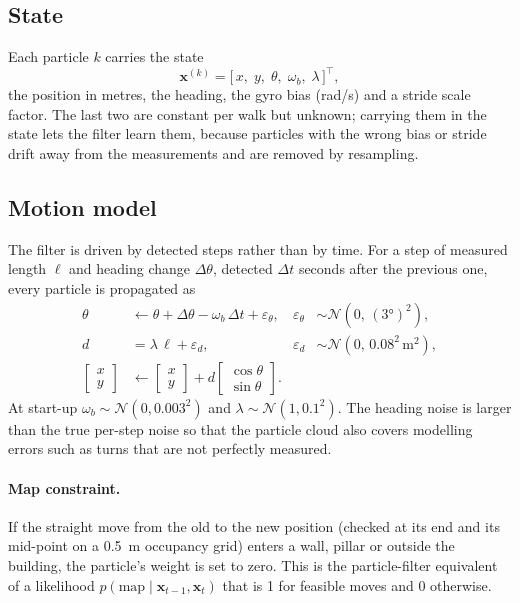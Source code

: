 \documentclass[11pt,a4paper]{article}
\begin{document}
\subsection{State}
Each particle $k$ carries the state
\begin{equation}
  \mathbf{x}^{(k)} = \bigl[\,x,\; y,\; \theta,\; \omega_b,\; \lambda\,\bigr]^{\top},
\end{equation}
the position in metres, the heading, the gyro bias (rad/s) and a stride scale factor.
The last two are constant per walk but unknown; carrying them in the state lets the
filter learn them, because particles with the wrong bias or stride drift away from the
measurements and are removed by resampling.

\subsection{Motion model}
The filter is driven by detected steps rather than by time. For a step of measured
length $\ell$ and heading change $\Delta\theta$, detected $\Delta t$ seconds after the
previous one, every particle is propagated as
\begin{align}
  \theta  &\leftarrow \theta + \Delta\theta - \omega_b\,\Delta t + \varepsilon_\theta,
           & \varepsilon_\theta &\sim \mathcal{N}(0,\, (\ang{3})^2), \label{eq:motion-heading}\\
  d       &= \lambda\,\ell + \varepsilon_d, & \varepsilon_d &\sim \mathcal{N}(0,\, 0.08^2\,\text{m}^2),\\
  \begin{bmatrix} x \\ y \end{bmatrix} &\leftarrow
  \begin{bmatrix} x \\ y \end{bmatrix} + d\begin{bmatrix} \cos\theta \\ \sin\theta \end{bmatrix}.
  \label{eq:motion-position}
\end{align}
At start-up $\omega_b\sim\mathcal{N}(0, 0.003^2)$ and $\lambda\sim\mathcal{N}(1, 0.1^2)$.
The heading noise is larger than the true per-step noise so that the particle cloud also
covers modelling errors such as turns that are not perfectly measured.

\paragraph{Map constraint.} If the straight move from the old to the new position
(checked at its end and its mid-point on a \SI{0.5}{m} occupancy grid) enters a wall,
pillar or outside the building, the particle's weight is set to zero. This is the
particle-filter equivalent of a likelihood $p(\text{map}\mid\mathbf{x}_{t-1},\mathbf{x}_t)$
that is 1 for feasible moves and 0 otherwise.
\end{document}

